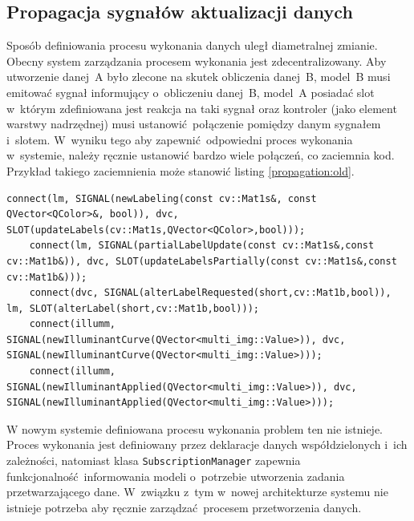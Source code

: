\subsection{Propagacja sygnałów aktualizacji danych}

Sposób definiowania procesu wykonania danych uległ diametralnej zmianie. Obecny system zarządzania procesem wykonania jest zdecentralizowany. Aby utworzenie danej~A było zlecone na skutek obliczenia danej~B, model~B musi emitować sygnał informujący o~obliczeniu danej~B, model~A posiadać slot w~którym zdefiniowana jest reakcja na taki sygnał oraz kontroler (jako element warstwy nadrzędnej) musi ustanowić połączenie pomiędzy danym sygnałem i~slotem. W~wyniku tego aby zapewnić odpowiedni proces wykonania w~systemie, należy ręcznie ustanowić bardzo wiele połączeń, co zaciemnia kod. Przykład takiego zaciemnienia może stanowić listing \ref{propagation:old}.

\begin{minipage}{\textwidth}
	\begin{lstlisting}[label=propagation:old, caption={Przykład definiowania procesu wykonania według starego systemu},alsoletter={()[].=}]
	connect(lm, SIGNAL(newLabeling(const cv::Mat1s&, const QVector<QColor>&, bool)), dvc, SLOT(updateLabels(cv::Mat1s,QVector<QColor>,bool)));
	connect(lm, SIGNAL(partialLabelUpdate(const cv::Mat1s&,const cv::Mat1b&)), dvc, SLOT(updateLabelsPartially(const cv::Mat1s&,const cv::Mat1b&)));
	connect(dvc, SIGNAL(alterLabelRequested(short,cv::Mat1b,bool)), lm, SLOT(alterLabel(short,cv::Mat1b,bool)));
	connect(illumm, SIGNAL(newIlluminantCurve(QVector<multi_img::Value>)), dvc, SIGNAL(newIlluminantCurve(QVector<multi_img::Value>)));
	connect(illumm, SIGNAL(newIlluminantApplied(QVector<multi_img::Value>)), dvc, SIGNAL(newIlluminantApplied(QVector<multi_img::Value>)));
	\end{lstlisting}
\end{minipage}

W nowym systemie definiowana procesu wykonania problem ten nie istnieje. Proces wykonania jest definiowany przez deklaracje danych współdzielonych i~ich zależności, natomiast klasa \lstinline$SubscriptionManager$ zapewnia funkcjonalność informowania modeli o~potrzebie utworzenia zadania przetwarzającego dane. W~związku z~tym w~nowej architekturze systemu nie istnieje potrzeba aby ręcznie zarządzać procesem przetworzenia danych.

